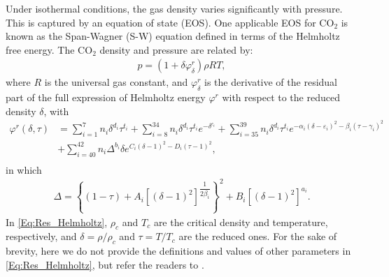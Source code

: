 Under isothermal conditions, the gas density varies significantly with pressure. This is {captured} by an equation of state (EOS). One applicable EOS for CO$_2$ is known as the Span-Wagner (S-W) equation \cite{span1996new} defined in terms of the Helmholtz free energy. The CO$_2$ density and pressure are related by:
\begin{equation}\label{Eq:Density_Pressure}
\begin{aligned}
p=\left(1+\delta\varphi^r_{\delta}\right)\rho RT,
\end{aligned}
\end{equation}
where $R$ is the universal gas constant, and $\varphi^r_{\delta}$ is the derivative of the residual part of the full expression of Helmholtz energy $\varphi^r$ with respect to the reduced density $\delta$, with %
\begin{equation}\label{Eq:Res_Helmholtz}
\begin{aligned}
\varphi^r\left(\delta,\tau\right) &= \sum_{i=1}^{7} n_i  \delta^{d_i}\tau^{t_i}+\sum_{i=8}^{34} n_i\delta^{d_i} \tau^{t_i} e^{-\delta^{c_i}}+ \sum_{i=35}^{39} n_i  \delta^{d_i}\tau^{t_i} e^{-\alpha_i\left(\delta-\varepsilon_i \right)^2-\beta_i\left(\tau-\gamma_i\right)^2}\\ &+\sum_{i=40}^{42} n_i\Delta^{b_i}\delta e^{C_i\left(\delta-1\right)^2-D_i\left(\tau-1\right) ^2},\\
\end{aligned}
\end{equation}
in which
\begin{equation*}\label{Eq:Delta}
\begin{aligned}
\Delta=\left\lbrace\left(1-\tau \right)+A_i\left[\left(\delta-1 \right)^2\right]^{\dfrac{1}{2\beta_i}}\right\rbrace ^2+B_i\left[\left(\delta-1 \right)^2\right]^{a_i}.
\end{aligned}
\end{equation*}
In \eqref{Eq:Res_Helmholtz}, $\rho_c$ and $T_c$ are the critical density and temperature, respectively, and $\delta=\rho/\rho_c$ and $\tau=T/T_c$ are the reduced ones. For the sake of brevity, here we do not provide the definitions and values of other parameters in \eqref{Eq:Res_Helmholtz}, but refer the readers to \cite{span1996new}.



